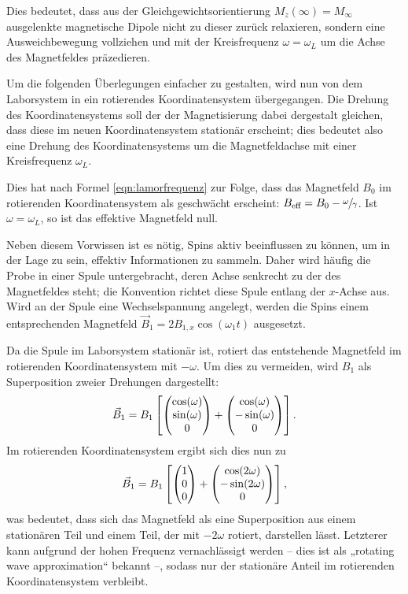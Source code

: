 Dies bedeutet, dass aus der Gleichgewichtsorientierung $M_z(\infty) = M_\infty$ ausgelenkte magnetische Dipole nicht zu dieser zurück relaxieren, sondern eine Ausweichbewegung vollziehen und mit der Kreisfrequenz $\omega = \omega_L$ um die Achse des Magnetfeldes präzedieren.

Um die folgenden Überlegungen einfacher zu gestalten, wird nun von dem Laborsystem in ein rotierendes Koordinatensystem übergegangen. Die Drehung des Koordinatensystems soll der der Magnetisierung dabei dergestalt gleichen, dass diese im neuen Koordinatensystem stationär erscheint; dies bedeutet also eine Drehung des Koordinatensystems um die Magnetfeldachse mit einer Kreisfrequenz $\omega_L$.

Dies hat nach Formel \eqref{eqn:lamorfrequenz} zur Folge, dass das Magnetfeld $B_0$ im rotierenden Koordinatensystem als geschwächt erscheint: $B_\text{eff} = B_0 - \sfrac{\omega}{\gamma}$. Ist $\omega = \omega_L$, so ist das effektive Magnetfeld null.


Neben diesem Vorwissen ist es nötig, Spins aktiv beeinflussen zu können, um in der Lage zu sein, effektiv Informationen zu sammeln. Daher wird häufig die Probe in einer Spule untergebracht, deren Achse senkrecht zu der des Magnetfeldes steht; die Konvention richtet diese Spule entlang der $x$-Achse aus. Wird an der Spule eine Wechselspannung angelegt, werden die Spins einem entsprechenden Magnetfeld $\vec{B}_1 = 2 B_{1,x} \cos(\omega_1 t)$ ausgesetzt.

Da die Spule im Laborsystem stationär ist, rotiert das entstehende Magnetfeld im rotierenden Koordinatensystem mit $-\omega$. Um dies zu vermeiden, wird $B_1$ als Superposition zweier Drehungen dargestellt:
\begin{align}
    \vec{B}_1 = B_1 \left[ \begin{pmatrix}\cos(\omega) \\ \sin(\omega) \\ 0\end{pmatrix} + 
                      \begin{pmatrix}\cos(\omega) \\ -\sin(\omega) \\ 0\end{pmatrix} \right].
\end{align}
Im rotierenden Koordinatensystem ergibt sich dies nun zu
\begin{align}
    \vec{B}_1 = B_1 \left[ \begin{pmatrix}1 \\ 0 \\ 0\end{pmatrix} + 
                      \begin{pmatrix}\cos(2\omega) \\ -\sin(2\omega) \\ 0\end{pmatrix} \right],
\end{align}
was bedeutet, dass sich das Magnetfeld als eine Superposition aus einem stationären Teil und einem Teil, der mit $-2\omega$ rotiert, darstellen lässt. Letzterer kann aufgrund der hohen Frequenz vernachlässigt werden -- dies ist als „rotating wave approximation“ bekannt --, sodass nur der stationäre Anteil im rotierenden Koordinatensystem verbleibt.

